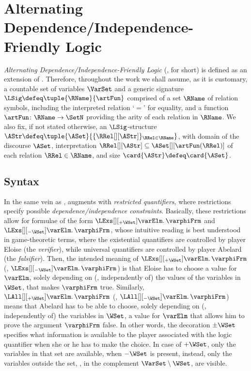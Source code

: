 \documentclass[authoryear]{elsarticle}
\begin{document}

\section{Alternating Dependence/Independence-Friendly Logic}
\label{sec:adif}

\emph{Alternating Dependence/In\-dependence-Friendly Logic} (\ADIF, for short)
is defined as an extension of \FOL.
Therefore, throughout the work we shall assume, as it is customary, a countable
set of variables $\VarSet$ and a generic signature $\LSig \defeq \tuple {\RName}
{\artFun}$ comprised of a set $\RName$ of relation symbols, including the
interpreted relation `$=$' for equality, and a function $\artFun \colon \RName
\rightarrow \SetN$ providing the arity of each relation in $\RName$.
We also fix, if not stated otherwise, an $\LSig$-structure $\AStr \defeq \tuple
{\ASet} {\{ \RRel[][\AStr] \}_{\RRel \in \RName}}$, with domain of the discourse
$\ASet$, interpretation $\RRel[][\AStr] \subseteq \ASet[][\artFun(\RRel)]$ of
each relation $\RRel \in \RName$, and size $\card{\AStr} \defeq \card{\ASet}$.




\subsection{Syntax}
\label{sec:adif;sub:syn}

In the same vein as \IF, \ADIF augments \FOL with \emph{restricted quantifiers},
where restrictions specify possible \emph{dependence/independence constraints}.
Basically, these restrictions allow for formulae of the form $\LExs[][_{+\WSet}]
\varElm \ldotp \varphiFrm$ and $\LExs[][_{-\WSet}] \varElm \ldotp \varphiFrm$,
whose intuitive reading is best understood in game-theoretic terms, where the
existential quantifiers are controlled by player Eloise (the \emph{verifier}),
while universal quantifiers are controlled by player Abelard (the
\emph{falsifier}).
Then, the intended meaning of $\LExs[][_{+\WSet}] \varElm \ldotp \varphiFrm$
(\resp, $\LExs[][_{-\WSet}] \varElm \ldotp \varphiFrm$) is that Eloise has to
choose a value for $\varElm$, solely depending on (\resp, independently of) the
values of the variables in $\WSet$, that makes $\varphiFrm$ true.
Similarly, $\LAll[][_{+\WSet}] \varElm \ldotp \varphiFrm$ (\resp,
$\LAll[][_{-\WSet}] \varElm \ldotp \varphiFrm$) means that Abelard has to be
able to choose, solely depending on (\resp, independently of) the variables in
$\WSet$, a value for $\varElm$ that allows him to prove the argument
$\varphiFrm$ false.
In other words, the decoration $\pm\WSet$ specifies what information is
available to the player associated with the logic quantifier when she or he has
to make the choice.
In case of $+\WSet$, only the variables in that set are available, when $-\WSet$
is present, instead, only the variables outside the set, \ie, in the complement
$\VarSet \setminus \WSet$, are visible.
\end{document}
